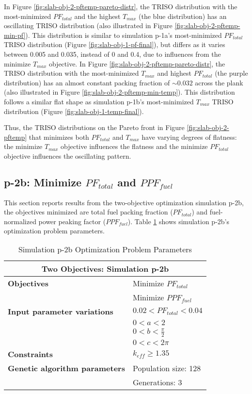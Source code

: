 In Figure \ref{fig:slab-obj-2-pftemp-pareto-distr}, the TRISO distribution with the
most-minimized $PF_{total}$ and the highest $T_{max}$ (the blue distribution) has an 
oscillating TRISO distribution (also illustrated in Figure 
\ref{fig:slab-obj-2-pftemp-min-pf}).
This distribution is similar to simulation p-1a's most-minimized $PF_{total}$ TRISO 
distribution (Figure \ref{fig:slab-obj-1-pf-final}), but differs as it varies between 
0.005 and 0.035, instead of 0 and 0.4, due to influences from the minimize $T_{max}$ 
objective. 
In Figure \ref{fig:slab-obj-2-pftemp-pareto-distr}, the TRISO distribution with the 
most-minimized $T_{max}$ and highest $PF_{total}$ (the purple distribution)
has an almost constant packing fraction of $\sim0.032$ across the plank (also 
illustrated in Figure \ref{fig:slab-obj-2-pftemp-min-temp}). 
This distribution follows a similar flat shape as simulation p-1b's most-minimized 
$T_{max}$ TRISO distribution (Figure \ref{fig:slab-obj-1-temp-final}).

Thus, the \gls{TRISO} distributions on the Pareto front in Figure \ref{fig:slab-obj-2-pftemp} 
that minimizes both $PF_{total}$ and $T_{max}$ have varying degrees of flatness: 
the minimize $T_{max}$ objective influences the flatness and the minimize $PF_{total}$ 
objective influences the oscillating pattern. 

\subsection{p-2b: Minimize $PF_{total}$ and $PPF_{fuel}$}
\label{sec:p-2b}
This section reports results from the two-objective optimization simulation p-2b, the 
objectives minimized are total fuel packing fraction ($PF_{total}$) and fuel-normalized 
power peaking factor ($PPF_{fuel}$).  
Table \ref{tab:simulationp2b} shows simulation p-2b's optimization problem parameters. 
\begin{table}[htbp!]
    \centering
    \onehalfspacing
    \caption{Simulation p-2b Optimization Problem Parameters}
	\label{tab:simulationp2b}
    \footnotesize
    \begin{tabular}{l|p{3cm}}
    \hline 
    \multicolumn{2}{c}{\textbf{Two Objectives: Simulation p-2b}} \\
    \hline 
    \textbf{Objectives} & Minimize $PF_{total}$ \\
    & Minimize $PPF_{fuel}$ \\
    \hline 
    \textbf{Input parameter variations} & $0.02<PF_{total}<0.04$ \\
    & $0<a<2$ \\
    & $0<b<\frac{\pi}{2}$ \\
    & $0<c<2\pi$ \\
    \hline
    \textbf{Constraints} & $k_{eff} \geq 1.35$\\ 
    \hline 
    \textbf{Genetic algorithm parameters} & Population size: 128 \\
    & Generations: 3 \\
    \hline
    \end{tabular}
\end{table}

